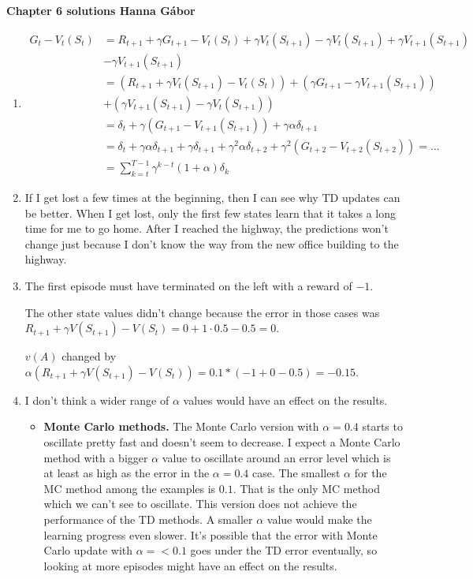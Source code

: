 \documentclass[12pt,a4paper]{article}
\begin{document}
\textbf{Chapter 6 solutions  \hfill Hanna Gábor}\\

\begin{enumerate}
\item
\begin{align*}
G_t - V_t(S_t) & = R_{t + 1} + \gamma G_{t + 1} - V_t(S_t) + \gamma V_t(S_{t + 1}) -
\gamma V_t(S_{t + 1}) + \gamma V_{t + 1}(S_{t + 1})\\
& - \gamma V_{t + 1}(S_{t + 1})\\
& = (R_{t + 1} + \gamma V_t(S_{t + 1}) - V_t(S_t)) + (\gamma G_{t + 1} - \gamma V_{t + 1}(S_{t + 1}))\\
& + (\gamma V_{t + 1}(S_{t + 1}) -\gamma V_t(S_{t + 1}))\\
& = \delta_t + \gamma(G_{t + 1} - V_{t + 1}(S_{t + 1})) + \gamma \alpha \delta_{t + 1}\\
& = \delta_t + \gamma \alpha \delta_{t + 1} + \gamma \delta_{t + 1} + \gamma^2 \alpha \delta_{t + 2} + \gamma^2(G_{t + 2} - V_{t + 2}(S_{t + 2})) = \dots\\
& = \sum\limits_{k = t}^{T - 1} \gamma^{k-t}( 1 + \alpha) \delta_{k}
\end{align*}

\item
If I get lost a few times at the beginning, then I can see why TD updates can be better.
When I get lost, only the first few states learn that it takes a long time for me to go home. After I reached the highway, the predictions won't change
just because I don't know the way from the new office building to the highway.

\item
The first episode must have terminated on the left with a reward of $-1$.

The other state values didn't change because the error in those cases was\\
$R_{t + 1} + \gamma V(S_{t + 1}) - V(S_t) = 0 + 1 \cdot 0.5 - 0.5 = 0$.

$v(A)$ changed by $\alpha (R_{t + 1} + \gamma V(S_{t + 1}) - V(S_t)) = 0.1 * (-1 + 0 - 0.5) = -0.15$.

\item
I don't think a wider range of $\alpha$ values would have an effect on the results.

\begin{itemize}
\item \textbf{Monte Carlo methods.}
The Monte Carlo version with $\alpha = 0.4$ starts to oscillate pretty fast and doesn't
seem to decrease. I expect a Monte Carlo method with a bigger $\alpha$ value to oscillate
around an error level which is at least as high as the error in the $\alpha = 0.4$
case. The smallest $\alpha$ for the MC method among the examples is $0.1$. That is
the only MC method which we can't see to oscillate. This version does not achieve the
performance of the TD methods. A smaller $\alpha$ value would make the learning progress
even slower. It's possible that the error with Monte Carlo update with $\alpha =<0.1$
goes under the TD error eventually, so looking at more episodes might have an effect
on the results.


\end{itemize}
\end{enumerate}
\end{document}
